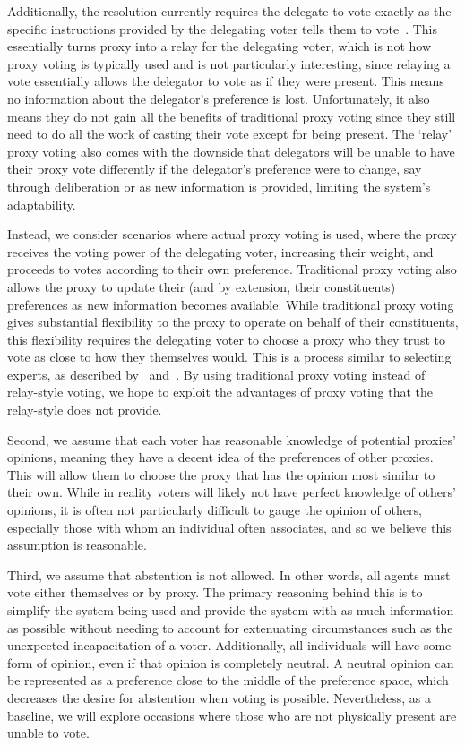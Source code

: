 Additionally, the resolution currently requires the delegate to vote exactly as the
specific instructions provided by the delegating voter tells them to
vote~\cite{CERP2020, Congress.gov2020}.
This essentially turns proxy into a relay for the delegating voter, which is not how
proxy voting is typically used and is not particularly interesting, since relaying a
vote essentially allows the delegator to vote as if they were present.
This means no information about the delegator's preference is lost.
Unfortunately, it also means they do not gain all the benefits of traditional proxy
voting since they still need to do all the work of casting their vote except for
being present.
The `relay' proxy voting also comes with the downside that delegators will be unable
to have their proxy vote differently if the delegator's preference were to change,
say through deliberation or as new information is provided, limiting the system's
adaptability.

Instead, we consider scenarios where actual proxy voting is used, where the proxy
receives the voting power of the delegating voter, increasing their weight, and
proceeds to votes according to their own preference.
Traditional proxy voting also allows the proxy to update their (and by extension, their
constituents) preferences as new information becomes available.
While traditional proxy voting gives substantial flexibility to the proxy to
operate on behalf of their constituents, this flexibility requires the delegating voter
to choose a proxy who they trust to vote as close to how they themselves would.
This is a process similar to selecting experts, as described by~\cite{Miller1969}
and~\cite{Mueller1972}.
By using traditional proxy voting instead of relay-style voting, we hope to exploit
the advantages of proxy voting that the relay-style does not provide.

Second, we assume that each voter has reasonable knowledge of potential proxies'
opinions, meaning they have a decent idea of the preferences of other proxies.
This will allow them to choose the proxy that has the opinion most similar to their own.
While in reality voters will likely not have perfect knowledge of others' opinions,
it is often not particularly difficult to gauge the opinion of others, especially
those with whom an individual often associates, and so we believe this assumption is
reasonable.

Third, we assume that abstention is not allowed.
In other words, all agents must vote either themselves or by proxy.
The primary reasoning behind this is to simplify the system being used and provide
the system with as much information as possible without needing to account for
extenuating circumstances such as the unexpected incapacitation of a voter.
Additionally, all individuals will have some form of opinion, even if that opinion is
completely neutral.
A neutral opinion can be represented as a preference close to the middle of the
preference space, which decreases the desire for abstention when voting is possible.
Nevertheless, as a baseline, we will explore occasions where those who are not
physically present are unable to vote.

